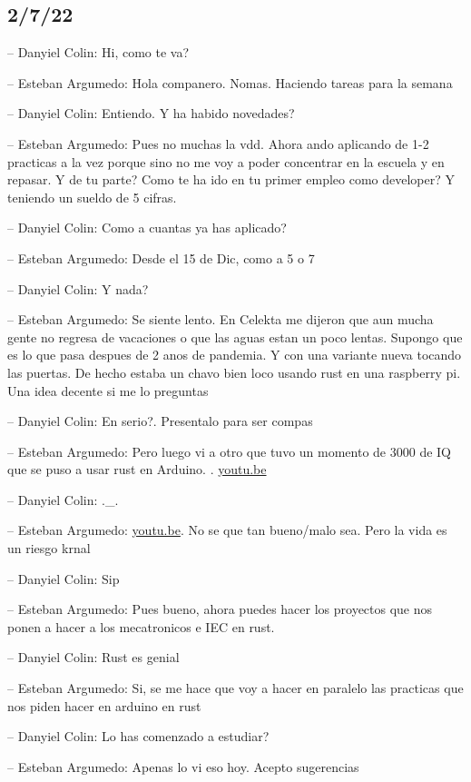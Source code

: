 \hypertarget{section}{%
\subsection{2/7/22}\label{section}}

-- Danyiel Colin: Hi, como te va?

-- Esteban Argumedo: Hola companero. Nomas. Haciendo tareas para la
semana

-- Danyiel Colin: Entiendo. Y ha habido novedades?

-- Esteban Argumedo: Pues no muchas la vdd. Ahora ando aplicando de 1-2
practicas a la vez porque sino no me voy a poder concentrar en la
escuela y en repasar. Y de tu parte? Como te ha ido en tu primer empleo
como developer? Y teniendo un sueldo de 5 cifras.

-- Danyiel Colin: Como a cuantas ya has aplicado?

-- Esteban Argumedo: Desde el 15 de Dic, como a 5 o 7

-- Danyiel Colin: Y nada?

-- Esteban Argumedo: Se siente lento. En Celekta me dijeron que aun
mucha gente no regresa de vacaciones o que las aguas estan un poco
lentas. Supongo que es lo que pasa despues de 2 anos de pandemia. Y con
una variante nueva tocando las puertas. De hecho estaba un chavo bien
loco usando rust en una raspberry pi. Una idea decente si me lo
preguntas

-- Danyiel Colin: En serio?. Presentalo para ser compas

-- Esteban Argumedo: Pero luego vi a otro que tuvo un momento de 3000 de
IQ que se puso a usar rust en Arduino. .
\href{https://youtu.be/ZPSqhb4KKNc}{youtu.be}

-- Danyiel Colin: .\_.

-- Esteban Argumedo: \href{https://youtu.be/Yi0WRF5WPFw}{youtu.be}. No
se que tan bueno/malo sea. Pero la vida es un riesgo krnal

-- Danyiel Colin: Sip

-- Esteban Argumedo: Pues bueno, ahora puedes hacer los proyectos que
nos ponen a hacer a los mecatronicos e IEC en rust.

-- Danyiel Colin: Rust es genial

-- Esteban Argumedo: Si, se me hace que voy a hacer en paralelo las
practicas que nos piden hacer en arduino en rust

-- Danyiel Colin: Lo has comenzado a estudiar?

-- Esteban Argumedo: Apenas lo vi eso hoy. Acepto sugerencias


